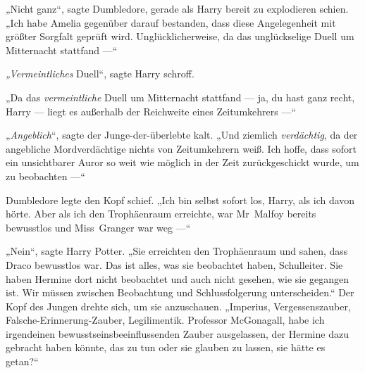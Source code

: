 „Nicht ganz“, sagte Dumbledore, gerade als Harry bereit zu explodieren schien.
„Ich habe Amelia gegenüber darauf bestanden, dass diese Angelegenheit mit größter Sorgfalt geprüft wird. Unglücklicherweise, da das unglückselige Duell um Mitternacht stattfand —“

\emph{„Vermeintliches} Duell“, sagte Harry schroff.

„Da das \emph{vermeintliche} Duell um Mitternacht stattfand — ja, du hast ganz recht, Harry — liegt es außerhalb der Reichweite eines Zeitumkehrers —“

„\emph{Angeblich}“, sagte der Junge-der-überlebte kalt.
„Und ziemlich \emph{verdächtig}, da der angebliche Mordverdächtige nichts von Zeitumkehrern weiß. Ich hoffe, dass sofort ein unsichtbarer Auror so weit wie möglich in der Zeit zurückgeschickt wurde, um zu beobachten —“

Dumbledore legte den Kopf schief.
„Ich bin selbst sofort los, Harry, als ich davon hörte. Aber als ich den Trophäenraum erreichte, war Mr~Malfoy bereits bewusstlos und Miss~Granger war weg —“

„Nein“, sagte Harry Potter.
„Sie erreichten den Trophäenraum und sahen, dass Draco bewusstlos war. Das ist alles, was sie beobachtet haben, Schulleiter. Sie haben Hermine dort nicht beobachtet und auch nicht gesehen, wie sie gegangen ist. Wir müssen zwischen Beobachtung und Schlussfolgerung unterscheiden.“ Der Kopf des Jungen drehte sich, um sie anzuschauen.
„Imperius, Vergessenszauber, Falsche-Erinnerung-Zauber, Legilimentik. Professor McGonagall, habe ich irgendeinen bewusstseinsbeeinflussenden Zauber ausgelassen, der Hermine dazu gebracht haben könnte, das zu tun oder sie glauben zu lassen, sie hätte es getan?“

